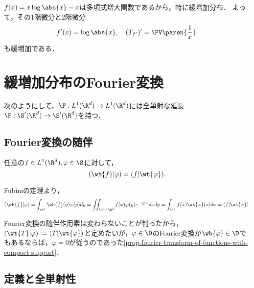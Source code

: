 \documentclass[uplatex,dvipdfmx]{jsreport}
\begin{document}
\begin{example}[$1/x$の主値超関数は緩増加である]
    $f(x)=x\log\abs{x}-x$は多項式増大関数であるから，特に緩増加分布．
    よって，その1階微分と2階微分
    \[f'(x)=\log\abs{x},\quad (T_{f'})'=\PV\paren{\frac{1}{x}}.\]
    も緩増加である．
\end{example}

\section{緩増加分布のFourier変換}

\begin{tcolorbox}[colframe=ForestGreen, colback=ForestGreen!10!white,breakable,colbacktitle=ForestGreen!40!white,coltitle=black,fonttitle=\bfseries\sffamily,
title=]
    次のようにして，$\F:L^1(\R^d)\to L^1(\R^d)$には全単射な延長$\F:\S'(\R^d)\to\S'(\R^d)$を持つ．
\end{tcolorbox}

\subsection{Fourier変換の随伴}

\begin{observation}[Fourier変換の随伴作用素]\label{observation-adjoint-of-Fourier-transform}
    任意の$f\in L^1(\R^d),\varphi\in\S$に対して，
    \[(\wh{f}|\varphi)=(f|\wt{\varphi}).\]
\end{observation}
\begin{Proof}
    Fubiniの定理より，
    \[(\wh{f}|\varphi)=\int_{\R^d}\wh{f}(y)\varphi(y)dy=\iint_{\R^d\times\R^d}f(x)\varphi(y)e^{-iy\cdot x}dxdy=\int_{\R^d}f(x)\wt{\varphi}(x)dx=(f|\wt{\varphi}).\]
\end{Proof}

\begin{remarks}[Fourier変換の延長における障碍]
    Fourier変換の随伴作用素は変わらないことが判ったから，$(\wt{T}|\varphi):=(T|\wt{\varphi})$と定めたいが，$\varphi\in\D$のFourier変換が$\wh{\varphi}\in\D$でもあるならば，$\varphi=0$が従うのであった\ref{prop-fourier-transform-of-functions-with-compact-support}．
\end{remarks}

\subsection{定義と全単射性}
\end{document}
